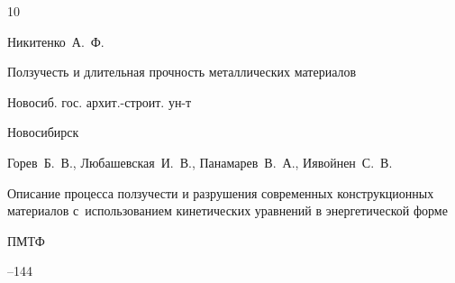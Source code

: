 \begin{thebibliography}{10}

\by Никитенко~А.~Ф.

\book Ползучесть и длительная прочность металлических материалов


\publ Новосиб. гос. архит.-строит. ун-т

\publaddr Новосибирск

















\by Горев~Б.~В., Любашевская~И.~В., Панамарев~В.~А., Иявойнен~С.~В.

\paper Описание процесса  ползучести и разрушения  современных конструкционных материалов с~использованием кинетических уравнений в энергетической форме 

\jour ПМТФ




--144









\end{thebibliography}
